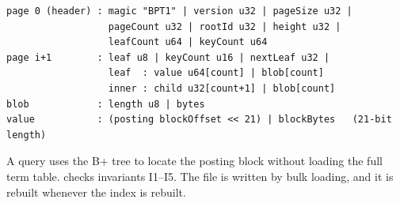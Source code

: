 \begin{lstlisting}[style=cli]
page 0 (header) : magic "BPT1" | version u32 | pageSize u32 |
                  pageCount u32 | rootId u32 | height u32 |
                  leafCount u64 | keyCount u64
page i+1        : leaf u8 | keyCount u16 | nextLeaf u32 |
                  leaf  : value u64[count] | blob[count]
                  inner : child u32[count+1] | blob[count]
blob            : length u8 | bytes
value           : (posting blockOffset << 21) | blockBytes   (21-bit length)
\end{lstlisting}

A query uses the B+ tree to locate the posting block without loading the full
term table.  checks invariants I1--I5. The file is written by
bulk loading, and it is rebuilt whenever the index is rebuilt.
